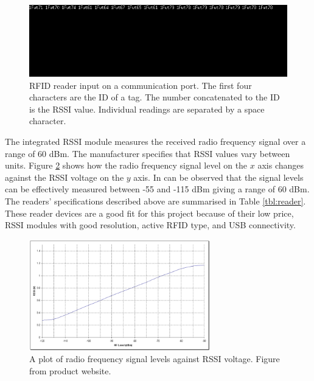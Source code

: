 \begin{figure}[h]
	\begin{center}
		\includegraphics[width=1\textwidth]{figures/com}
		\caption{RFID reader input on a communication port. The first four characters are the ID of a tag. The number concatenated to the ID is the RSSI value. Individual readings are separated by a space character.}
		\label{fig:comm}
	\end{center}
\end{figure}

The integrated RSSI module measures the received radio frequency signal over a range of 60 dBm. The manufacturer specifies that RSSI values vary between units\footnotemark[2].  Figure \ref{fig:rssi} shows how the radio frequency signal level on the $x$ axis changes against the RSSI voltage on the $y$ axis. In can be observed that the signal levels can be effectively measured between -55 and -115 dBm giving a range of 60 dBm. The readers' specifications described above are summarised in Table \ref{tbl:reader}. These reader devices are a good fit for this project because of their low price, RSSI modules with good resolution, active RFID type, and USB connectivity.

\begin{figure}[h]
	\begin{center}
		\includegraphics[width=0.7\textwidth]{figures/rssi}
		\caption{A plot of radio frequency signal levels against RSSI voltage. Figure from product website\protect\footnotemark[2].}
		\label{fig:rssi}
	\end{center}
\end{figure}

